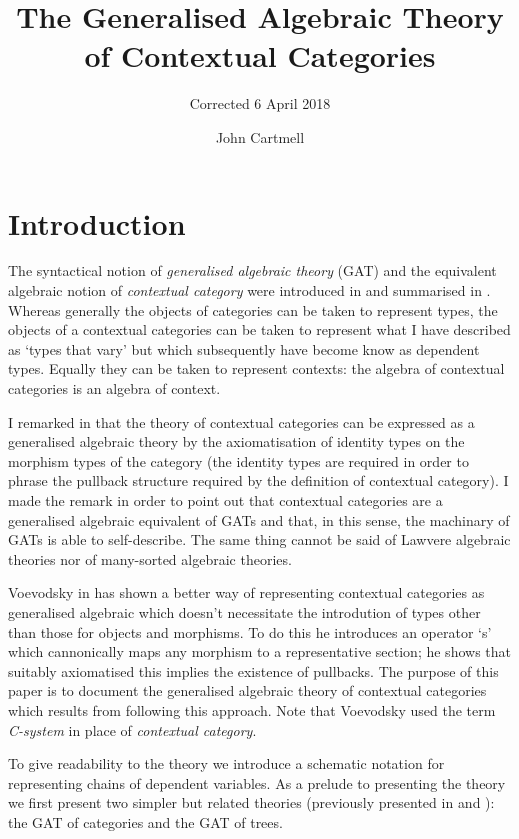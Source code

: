 \documentclass[10pt,a4paper]{scrartcl}
\title{The Generalised Algebraic Theory of Contextual Categories}
\subtitle{Corrected 6 April 2018}
\author{John Cartmell}
\begin{document}
\maketitle


\section{Introduction}
The syntactical notion of \textit{generalised algebraic theory} (GAT) and the  equivalent algebraic notion of \textit{contextual category} were introduced in  \cite{Cartmell78} and summarised in \cite{Cartmell86}. Whereas generally the objects of categories can be taken to represent types, the objects of a contextual categories can be taken to represent what I have described as `types that vary' but which subsequently have become know as dependent types. Equally they can be taken to represent contexts: the algebra of contextual categories is an algebra of context. 

I remarked in
\cite{Cartmell78} that the theory of contextual categories can be expressed as a generalised algebraic theory by the axiomatisation of identity types on the morphism types of the category 
(the identity types are required in order to phrase the pullback structure required by the definition of contextual category). I made the remark in order to point out that contextual categories are a generalised algebraic equivalent of GATs and that, in this sense, the machinary of GATs is able to self-describe.  The same thing cannot be said of Lawvere algebraic theories nor of many-sorted algebraic theories.  

 Voevodsky in \cite{Voevodsky14C} has shown a better way of representing contextual categories as generalised algebraic which doesn't necessitate the introdution of types other than those for objects and morphisms. To do this he introduces an operator `s' which cannonically maps any morphism to a representative section; he shows that suitably axiomatised this implies the existence of pullbacks.  The purpose of this paper is to document the generalised algebraic theory
of contextual categories which results from following this approach. Note that Voevodsky used the term \textit{C-system} in place of \textit{contextual category}.

To give readability to the theory we introduce a schematic notation for representing chains of dependent variables. As a prelude to presenting the theory we first present two simpler but related theories (previously presented in \cite{Cartmell78} and \cite{Cartmell86}): the GAT of categories and the GAT of trees.
\end{document}
